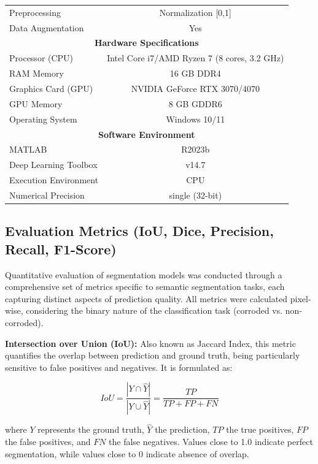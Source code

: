 \documentclass[12pt,a4paper,twoside]{article}
\begin{document}
\begin{table}[htbp]
\begin{tabular}{|l|c|c|}
Preprocessing & \multicolumn{2}{c|}{Normalization [0,1]} \\
Data Augmentation & \multicolumn{2}{c|}{Yes} \\
\hline
\multicolumn{3}{|c|}{\textbf{Hardware Specifications}} \\
\hline
Processor (CPU) & \multicolumn{2}{c|}{Intel Core i7/AMD Ryzen 7 (8 cores, 3.2 GHz)} \\
RAM Memory & \multicolumn{2}{c|}{16 GB DDR4} \\
Graphics Card (GPU) & \multicolumn{2}{c|}{NVIDIA GeForce RTX 3070/4070} \\
GPU Memory & \multicolumn{2}{c|}{8 GB GDDR6} \\
Operating System & \multicolumn{2}{c|}{Windows 10/11} \\
\hline
\multicolumn{3}{|c|}{\textbf{Software Environment}} \\
\hline
MATLAB & \multicolumn{2}{c|}{R2023b} \\
Deep Learning Toolbox & \multicolumn{2}{c|}{v14.7} \\
Execution Environment & \multicolumn{2}{c|}{CPU} \\
Numerical Precision & \multicolumn{2}{c|}{single (32-bit)} \\
\hline
\end{tabular}
\end{table}

\subsection{Evaluation Metrics (IoU, Dice, Precision, Recall, F1-Score)}
\label{subsec:metrics}

Quantitative evaluation of segmentation models was conducted through a comprehensive set of metrics specific to semantic segmentation tasks, each capturing distinct aspects of prediction quality. All metrics were calculated pixel-wise, considering the binary nature of the classification task (corroded vs. non-corroded).

\textbf{Intersection over Union (IoU):} Also known as Jaccard Index, this metric quantifies the overlap between prediction and ground truth, being particularly sensitive to false positives and negatives. It is formulated as:

\begin{equation}
IoU = \frac{|Y \cap \hat{Y}|}{|Y \cup \hat{Y}|} = \frac{TP}{TP + FP + FN}
\end{equation}

where $Y$ represents the ground truth, $\hat{Y}$ the prediction, $TP$ the true positives, $FP$ the false positives, and $FN$ the false negatives. Values close to 1.0 indicate perfect segmentation, while values close to 0 indicate absence of overlap.
\end{document}
